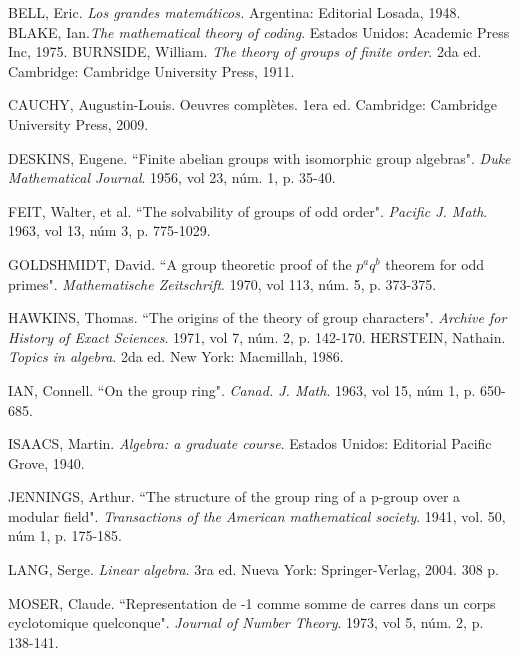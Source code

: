 \begin{thebibliography}{99}
     BELL, Eric. \textit{Los grandes matemáticos.} Argentina: Editorial Losada, 1948.
     BLAKE, Ian.\textit{The mathematical theory of coding}. Estados Unidos: Academic Press Inc, 1975.
     BURNSIDE, William. \textit{The theory of groups of finite order}. 	2da ed. Cambridge: Cambridge University Press, 1911.
        
    
      CAUCHY, Augustin-Louis. Oeuvres complètes. 1era ed. Cambridge: Cambridge University Press, 2009.
     
      DESKINS, Eugene. ``Finite abelian groups with isomorphic group algebras". \textit{Duke Mathematical Journal}. 1956, vol 23, núm. 1, p. 35-40.
     
       FEIT, Walter, et al.  ``The solvability of groups of odd order". \textit{Pacific J. Math}. 1963, vol 13, núm 3, p. 775-1029.
      
      GOLDSHMIDT, David. ``A group theoretic proof of the $p^aq^b$ theorem for odd primes". \textit{Mathematische Zeitschrift}. 1970, vol 113, núm. 5, p. 373-375.
    
      HAWKINS, Thomas. ``The origins of the theory of group characters". \textit{Archive for History of Exact Sciences}. 1971, vol 7, núm. 2, p. 142-170.
     HERSTEIN, Nathain. \textit{Topics in algebra}. 2da ed.  New York: Macmillah, 1986.  
    
 	 IAN, Connell. ``On the group ring". \textit{Canad. J. Math}. 1963, vol 15, núm 1, p. 650-685.
 	
   ISAACS, Martin. \textit{Algebra: a graduate course}. Estados Unidos: Editorial Pacific Grove, 1940.   
   
    JENNINGS, Arthur. ``The structure of the group ring of a p-group over a modular field". \textit{Transactions of the American mathematical society}. 1941, vol. 50, núm 1, p. 175-185.
   
   
    LANG, Serge. \textit{Linear algebra}. 3ra ed. Nueva York: Springer-Verlag, 2004. 308 p.
    
     MOSER, Claude. ``Representation de -1 comme somme de carres dans un corps cyclotomique quelconque". \textit{Journal of Number Theory}. 1973, vol 5, núm. 2, p. 138-141.
    

\end{thebibliography}
